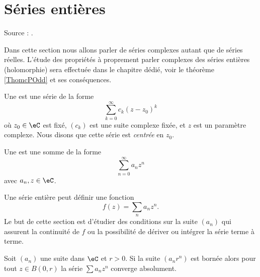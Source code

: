 
\section{Séries entières}

Source : \cite{RomainBoilEnt}. 

Dans cette section nous allons parler de séries complexes autant que de séries réelles. L'étude des propriétés à proprement parler complexes des séries entières (holomorphie) sera effectuée dans le chapitre dédié, voir le théorème \ref{ThomcPOdd} et ses conséquences.

Une  est une série de la forme
\begin{equation}		\label{eqseriepuissance}
	\sum_{k=0}^{\infty}c_k(z-z_0)^k
\end{equation}
où $z_0\in \eC$ est fixé, $(c_k)$ est une suite complexe fixée, et $z$ est un paramètre complexe. Nous disons que cette série est \emph{centrée} en $z_0$.

\begin{definition}
    Une  est une somme de la forme
    \begin{equation}
        \sum_{n=0}^{\infty}a_nz^n
    \end{equation}
    avec \( a_n,z\in\eC\).    
\end{definition}
Une série entière peut définir une fonction
\begin{equation}
    f(z)=\sum_na_nz^n.
\end{equation}
Le but de cette section est d'étudier des conditions sur la suite \( (a_n)\) qui assurent la continuité de \( f\) ou la possibilité de dériver ou intégrer la série terme à terme.


\begin{lemma}   \label{LemmbWnFI}
    Soit \( (a_n)\) une suite dans \( \eC\) et \( r>0\). Si la suite \( (a_nr^n)\) est bornée alors pour tout \( z\in B(0,r)\) la série \( \sum a_nz^n\) converge absolument.
\end{lemma}

